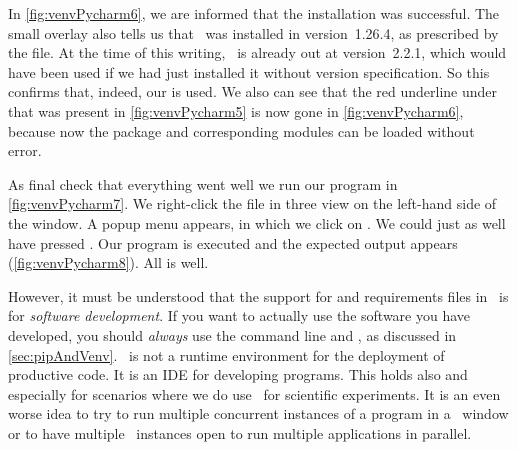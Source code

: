 In \cref{fig:venvPycharm6}, we are informed that the installation was successful.
The small overlay also tells us that \numpy\ was installed in version~1.26.4, as prescribed by the  file.
At the time of this writing, \numpy\ is already out at version~2.2.1, which would have been used if we had just installed it without version specification.
So this confirms that, indeed, our  is used.
We also can see that the red underline under  that was present in \cref{fig:venvPycharm5} is now gone in \cref{fig:venvPycharm6}, because now the package and corresponding modules can be loaded without error.

As final check that everything went well we run our program  in \cref{fig:venvPycharm7}.
We right-click the file in three view on the left-hand side of the window.
A popup menu appears, in which we click on .
We could just as well have pressed .
Our program is executed and the expected output appears (\cref{fig:venvPycharm8}).
All is well.

However, it must be understood that the support for  and requirements files in \pycharm\ is for \emph{software development}.
If you want to actually use the software you have developed, you should \emph{always} use the command line and , as discussed in \cref{sec:pipAndVenv}.
\pycharm\ is not a runtime environment for the deployment of productive code.
It is an \acrfull{IDE} for developing programs.%
%
%
%
This holds also and especially for scenarios where we do use \python\ for scientific experiments.
It is an even worse idea to try to run multiple concurrent instances of a program in a \pycharm\ window or to have multiple \pycharm\ instances open to run multiple applications in parallel.%
%
\FloatBarrier%
\endhsection%
%
